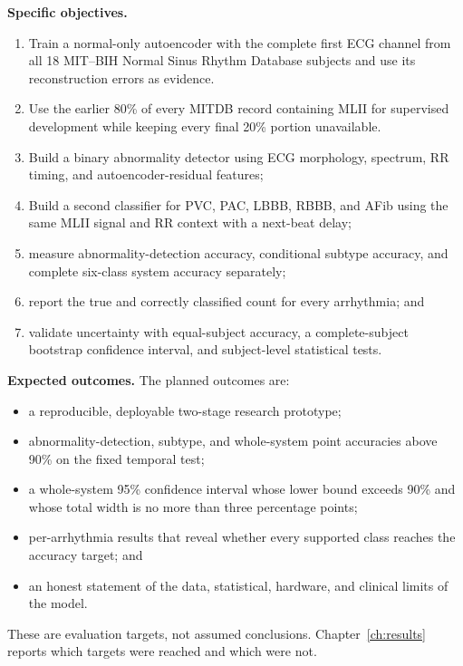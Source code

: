 \textbf{Specific objectives.}
\begin{enumerate}
    \item Train a normal-only autoencoder with the complete first ECG channel
    from all 18 MIT--BIH Normal Sinus Rhythm Database subjects and use its
    reconstruction errors as evidence.
    \item Use the earlier 80\% of every MITDB record containing MLII for
    supervised development while keeping every final 20\% portion unavailable.
    \item Build a binary abnormality detector using ECG morphology, spectrum,
    RR timing, and autoencoder-residual features;
    \item Build a second classifier for PVC, PAC, LBBB, RBBB, and AFib using
    the same MLII signal and RR context with a next-beat delay;
    \item measure abnormality-detection accuracy, conditional subtype accuracy,
    and complete six-class system accuracy separately;
    \item report the true and correctly classified count for every arrhythmia;
    and
    \item validate uncertainty with equal-subject accuracy, a complete-subject
    bootstrap confidence interval, and subject-level statistical tests.
\end{enumerate}

\textbf{Expected outcomes.}
The planned outcomes are:
\begin{itemize}
    \item a reproducible, deployable two-stage research prototype;
    \item abnormality-detection, subtype, and whole-system point accuracies
    above 90\% on the fixed temporal test;
    \item a whole-system 95\% confidence interval whose lower bound exceeds
    90\% and whose total width is no more than three percentage points;
    \item per-arrhythmia results that reveal whether every supported class
    reaches the accuracy target; and
    \item an honest statement of the data, statistical, hardware, and clinical
    limits of the model.
\end{itemize}

These are evaluation targets, not assumed conclusions. Chapter~\ref{ch:results}
reports which targets were reached and which were not.

